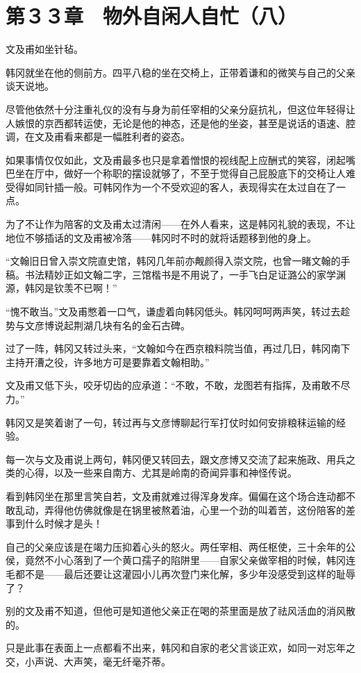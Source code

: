 \section{第３３章　物外自闲人自忙（八）}

文及甫如坐针毡。

韩冈就坐在他的侧前方。四平八稳的坐在交椅上，正带着谦和的微笑与自己的父亲谈天说地。

尽管他依然十分注重礼仪的没有与身为前任宰相的父亲分庭抗礼，但这位年轻得让人嫉恨的京西都转运使，无论是他的神态，还是他的坐姿，甚至是说话的语速、腔调，在文及甫看来都是一幅胜利者的姿态。

如果事情仅仅如此，文及甫最多也只是拿着憎恨的视线配上应酬式的笑容，闭起嘴巴坐在厅中，做好一个称职的摆设就够了，不至于觉得自己屁股底下的交椅让人难受得如同针插一般。可韩冈作为一个不受欢迎的客人，表现得实在太过自在了一点。

为了不让作为陪客的文及甫太过清闲——在外人看来，这是韩冈礼貌的表现，不让地位不够插话的文及甫被冷落——韩冈时不时的就将话题移到他的身上。

“文翰旧日曾入崇文院直史馆，韩冈几年前亦觍颜得入崇文院，也曾一睹文翰的手稿。书法精妙正如文翰二字，三馆楷书是不用说了，一手飞白足证潞公的家学渊源，韩冈是钦羡不已啊！”

“愧不敢当。”文及甫憋着一口气，谦虚着向韩冈低头。韩冈呵呵两声笑，转过去趁势与文彦博说起荆湖几块有名的金石古碑。

过了一阵，韩冈又转过头来，“文翰如今在西京粮料院当值，再过几日，韩冈南下主持开漕之役，许多地方可是要靠着文翰相助。”

文及甫又低下头，咬牙切齿的应承道：“不敢，不敢，龙图若有指挥，及甫敢不尽力。”

韩冈又是笑着谢了一句，转过再与文彦博聊起行军打仗时如何安排粮秣运输的经验。

每一次与文及甫说上两句，韩冈便又转回去，跟文彦博又交流了起来施政、用兵之类的心得，以及一些来自南方、尤其是岭南的奇闻异事和神怪传说。

看到韩冈坐在那里言笑自若，文及甫就难过得浑身发痒。偏偏在这个场合连动都不敢乱动，弄得他仿佛就像是在锅里被熬着油，心里一个劲的叫着苦，这份陪客的差事到什么时候才是头！

自己的父亲应该是在竭力压抑着心头的怒火。两任宰相、两任枢使，三十余年的公侯，竟然不小心落到了一个黄口孺子的陷阱里——自家父亲做宰相的时候，韩冈连毛都不是——最后还要让这灌园小儿再次登门来化解，多少年没感受到这样的耻辱了？

别的文及甫不知道，但他可是知道他父亲正在喝的茶里面是放了祛风活血的消风散的。

只是此事在表面上一点都看不出来，韩冈和自家的老父言谈正欢，如同一对忘年之交，小声说、大声笑，毫无纤毫芥蒂。


